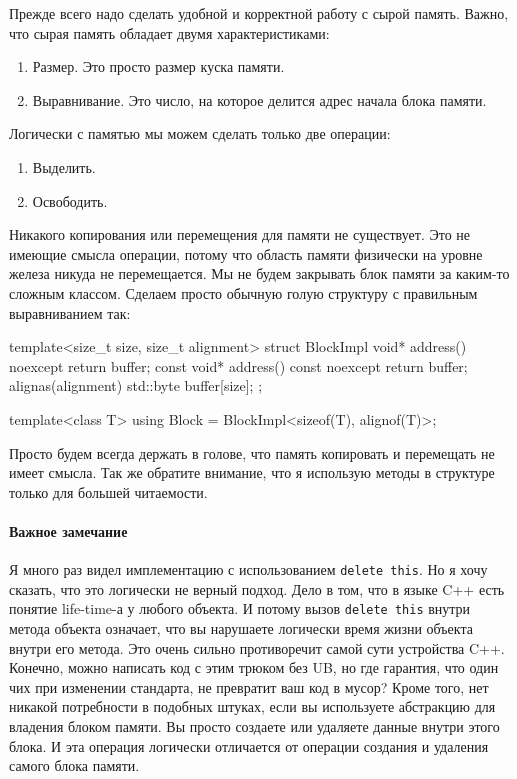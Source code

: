 Прежде всего надо сделать удобной и корректной работу с сырой память.
Важно, что сырая память обладает двумя характеристиками:
\begin{enumerate}
\item Размер.
Это просто размер куска памяти.

\item Выравнивание.
Это число, на которое делится адрес начала блока памяти.
\end{enumerate}
Логически с памятью мы можем сделать только две операции:
\begin{enumerate}
\item Выделить.

\item Освободить.
\end{enumerate}
Никакого копирования или перемещения для памяти не существует.
Это не имеющие смысла операции, потому что область памяти физически на уровне железа никуда не перемещается.
Мы не будем закрывать блок памяти за каким-то сложным классом.
Сделаем просто обычную голую структуру с правильным выравниванием так:
\begin{cppcode}
template<size_t size, size_t alignment>
struct BlockImpl {
  void* address() noexcept {
    return buffer;
  }
  const void* address() const noexcept {
    return buffer;
  }
  alignas(alignment) std::byte buffer[size];
};

template<class T>
using Block = BlockImpl<sizeof(T), alignof(T)>;
\end{cppcode}
Просто будем всегда держать в голове, что память копировать и перемещать не имеет смысла.
Так же обратите внимание, что я использую методы в структуре только для большей читаемости.

\paragraph{Важное замечание}

Я много раз видел имплементацию с использованием \verb"delete this".
Но я хочу сказать, что это логически не верный подход.
Дело в том, что в языке C++ есть понятие life-time-а у любого объекта.
И потому вызов \verb"delete this" внутри метода объекта означает, что вы нарушаете логически время жизни объекта внутри его метода.
Это очень сильно противоречит самой сути устройства C++.
Конечно, можно написать код с этим трюком без UB, но где гарантия, что один чих при изменении стандарта, не превратит ваш код в мусор?
Кроме того, нет никакой потребности в подобных штуках, если вы используете абстракцию для владения блоком памяти.
Вы просто создаете или удаляете данные внутри этого блока.
И эта операция логически отличается от операции создания и удаления самого блока памяти.

